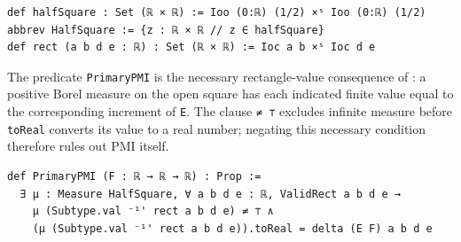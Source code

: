 \documentclass[11pt]{article}
\begin{document}
\begin{appendices}
\begin{verbatim}
def halfSquare : Set (ℝ × ℝ) := Ioo (0:ℝ) (1/2) ×ˢ Ioo (0:ℝ) (1/2)
abbrev HalfSquare := {z : ℝ × ℝ // z ∈ halfSquare}
def rect (a b d e : ℝ) : Set (ℝ × ℝ) := Ioc a b ×ˢ Ioc d e
\end{verbatim}
\endgroup
The predicate \texttt{PrimaryPMI} is the necessary rectangle-value
consequence of \cite[Definition 1]{ft}: a positive Borel measure on the
open square has each indicated finite value equal to the corresponding
increment of \texttt{E}. The clause \texttt{≠ ⊤} excludes infinite measure
before \texttt{toReal} converts its value to a real number; negating this
necessary condition therefore rules out PMI itself.
\begingroup
\footnotesize
\begin{verbatim}
def PrimaryPMI (F : ℝ → ℝ → ℝ) : Prop :=
  ∃ μ : Measure HalfSquare, ∀ a b d e : ℝ, ValidRect a b d e →
    μ (Subtype.val ⁻¹' rect a b d e) ≠ ⊤ ∧
    (μ (Subtype.val ⁻¹' rect a b d e)).toReal = delta (E F) a b d e
\end{verbatim}
\endgroup
\end{appendices}
\end{document}

